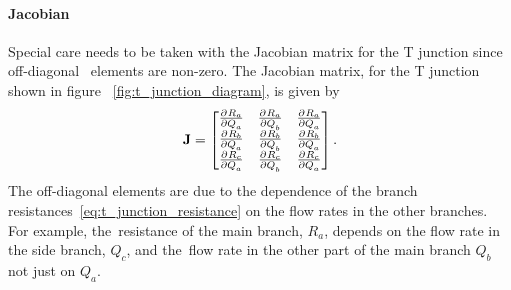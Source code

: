 \paragraph{Jacobian}

Special care needs to be taken with the Jacobian matrix for the T junction since off-diagonal \
elements are non-zero. The Jacobian matrix, for the T junction shown in figure \
\ref{fig:t_junction_diagram}, is given by
\begin{align}
    \mathbf{J} = 
    \begin{bmatrix}
        \frac{\partial^{} R_a}{\partial Q_a^{}} & \frac{\partial^{} R_a}{\partial Q_b^{}} & \frac{\partial^{} R_a}{\partial Q_a^{}} \\
        \frac{\partial^{} R_b}{\partial Q_a^{}} & \frac{\partial^{} R_b}{\partial Q_b^{}} & \frac{\partial^{} R_b}{\partial Q_a^{}} \\
        \frac{\partial^{} R_c}{\partial Q_a^{}} & \frac{\partial^{} R_c}{\partial Q_b^{}} & \frac{\partial^{} R_c}{\partial Q_a^{}} 
    \end{bmatrix}.
\end{align}
The off-diagonal elements are due to the dependence of the branch resistances\
\eqref{eq:t_junction_resistance} on the flow rates in the other branches. For example, the\
resistance of the main branch, $R_a$, depends on the flow rate in the side branch, $Q_c$, and the\
flow rate in the other part of the main branch $Q_b$ not just on $Q_a$.





